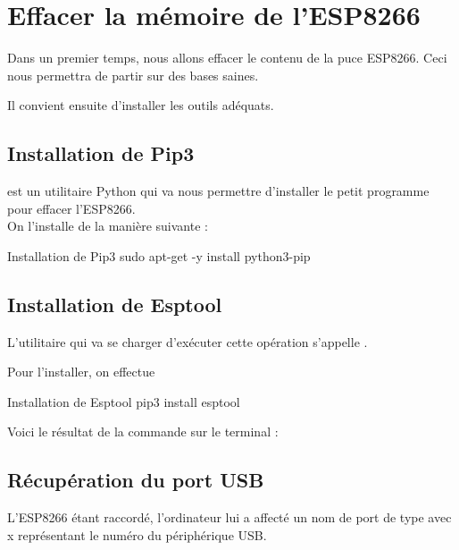 \section{Effacer la mémoire de l'ESP8266}

Dans un premier temps, nous allons effacer le contenu de la puce ESP8266. Ceci nous permettra de partir sur des bases saines. \\


Il convient ensuite d'installer les outils adéquats.

\subsection{Installation de Pip3}

 est un utilitaire Python qui va nous permettre d'installer le petit programme pour effacer l'ESP8266. \\
On l'installe de la manière suivante : 

\begin{Bash}{Installation de Pip3}
sudo apt-get -y install python3-pip
\end{Bash}


\subsection{Installation de Esptool}

L'utilitaire qui va se charger d'exécuter cette opération s'appelle .

Pour l'installer, on effectue

\begin{Bash}{Installation de Esptool}
pip3 install esptool
\end{Bash}

Voici le résultat de la commande sur le terminal : 




\subsection{Récupération du port USB}

L'ESP8266 étant raccordé, l'ordinateur lui a affecté un nom de port de type  avec x représentant le numéro du périphérique USB. \\

